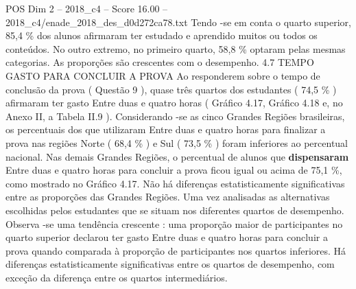 \begin{textsample}{POS Dim 2 – 2018\_c4 – Score 16.00 – 2018\_c4/enade\_2018\_des\_d0d272ca78.txt}
Tendo -se em conta o quarto superior, 85,4 \% dos alunos afirmaram ter estudado e aprendido muitos ou todos os conteúdos.
No outro extremo, no primeiro quarto, 58,8 \% optaram pelas mesmas categorias.
As proporções são crescentes com o desempenho. 4.7 TEMPO GASTO PARA CONCLUIR A PROVA Ao responderem sobre o tempo de conclusão da prova ( Questão 9 ), quase três quartos dos estudantes ( 74,5 \% ) afirmaram ter gasto Entre duas e quatro horas ( Gráfico 4.17, Gráfico 4.18 e, no Anexo II, a Tabela II.9 ).
Considerando -se as cinco Grandes Regiões brasileiras, os percentuais dos que utilizaram Entre duas e quatro horas para finalizar a prova nas regiões Norte ( 68,4 \% ) e Sul ( 73,5 \% ) foram inferiores ao percentual nacional.
Nas demais Grandes Regiões, o percentual de alunos que \textbf{dispensaram} Entre duas e quatro horas para concluir a prova ficou igual ou acima de 75,1 \%, como mostrado no Gráfico 4.17.
Não há diferenças estatisticamente significativas entre as proporções das Grandes Regiões.
Uma vez analisadas as alternativas escolhidas pelos estudantes que se situam nos diferentes quartos de desempenho.
Observa -se uma tendência crescente : uma proporção maior de participantes no quarto superior declarou ter gasto Entre duas e quatro horas para concluir a prova quando comparada à proporção de participantes nos quartos inferiores.
Há diferenças estatisticamente significativas entre os quartos de desempenho, com exceção da diferença entre os quartos intermediários.

\end{textsample}
